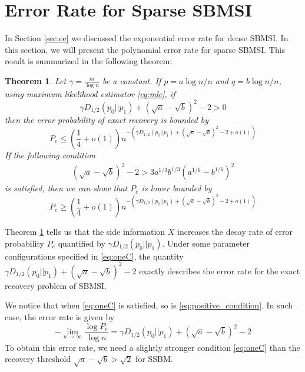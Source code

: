 \documentclass[conference,letterpaper]{IEEEtran}
\newtheorem{theorem}{Theorem}
\begin{document}
\section{Error Rate for Sparse SBMSI}\label{sec:ees}
In Section \ref{sec:ee} we discussed the exponential error rate for dense SBMSI.
In this section, we will present the polynomial error rate for sparse SBMSI.
This result is summarized in the following theorem:
\begin{theorem}\label{thm:Pe}
Let $\gamma = \frac{ m}{\log n}$ be a constant. If $p = a \log n /n$ and $q = b \log n / n$, using maximum likelihood estimator \eqref{eq:mle},
if
\begin{equation}\label{eq:positive_condition}
\gamma D_{1/2}(p_0||p_1) + (\sqrt{a} - \sqrt{b})^2-2 > 0
\end{equation}
then the error probability
of exact recovery is bounded by
\begin{equation}\label{eq:PeMain}
P_e \leq (\frac{1}{4}+o(1)) n^{-\left(\gamma D_{1/2}(p_0||p_1) + (\sqrt{a} - \sqrt{b})^2-2 + o(1)\right) }
\end{equation}
If the following condition
\begin{align}
(\sqrt{a}-\sqrt{b})^2-2 
> 3a^{1/3}b^{1/3}(a^{1/6}-b^{1/6})^2\label{eq:oneC}
\end{align}
is satisfied, then we can show that $P_e$ is lower bounded by
\begin{equation}\label{eq:PeMainL}
P_e \geq (\frac{1}{4}+o(1)) n^{-\left(\gamma D_{1/2}(p_0||p_1) + (\sqrt{a} - \sqrt{b})^2-2 + o(1)\right)}
\end{equation}
\end{theorem}
Theorem \ref{thm:Pe} tells us that the side information $X$ increases the
decay rate of error probability $P_e$ quantified by $\gamma D_{1/2}(p_0||p_1)$.
Under some parameter configurations specified in \eqref{eq:oneC},
the quantity $\gamma D_{1/2}(p_0||p_1) + (\sqrt{a} - \sqrt{b})^2-2$
exactly describes the error rate for the exact recovery problem of SBMSI.

We notice that when \eqref{eq:oneC} is satisfied,
so is \eqref{eq:positive_condition}. In such case, the error
rate is given by
$$
-\lim_{n\to \infty} \frac{\log P_e}{\log n}
= \gamma D_{1/2}(p_0||p_1) + (\sqrt{a} - \sqrt{b})^2-2
$$
To obtain this error rate,
we need a slightly stronger condition \eqref{eq:oneC}
than the recovery threshold $\sqrt{a}-\sqrt{b} > \sqrt{2}$
for SSBM.
\end{document}
